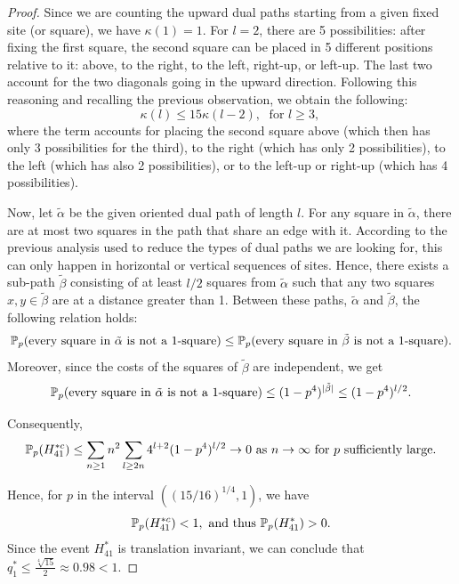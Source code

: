 \begin{proof}
            Since we are counting the upward dual paths starting from a given fixed site (or square), we have $\kappa(1) = 1$. For $l = 2$, there are 5 possibilities: after fixing the first square, the second square can be placed in 5 different positions relative to it: above, to the right, to the left, right-up, or left-up. The last two account for the two diagonals going in the upward direction. Following this reasoning and recalling the previous observation, we obtain the following:
            \[
                \kappa(l) \leq 15\kappa(l - 2),\; \text{  for $l \geq 3$, }
            \] 
            where the term accounts for placing the second square above (which then has only 3 possibilities for the third), to the right (which has only 2 possibilities), to the left (which has also 2 possibilities), or to the left-up or right-up (which has 4 possibilities).

            Now, let $\tilde{\alpha}$ be the given oriented dual path of length $l$. For any square in $\tilde{\alpha}$, there are at most two squares in the path that share an edge with it. According to the previous analysis used to reduce the types of dual paths we are looking for, this can only happen in horizontal or vertical sequences of sites. Hence, there exists a sub-path $\tilde{\beta}$ consisting of at least $l/2$ squares from $\tilde{\alpha}$ such that any two squares $x, y \in \tilde{\beta}$ are at a distance greater than 1. Between these paths, $\tilde{\alpha}$ and $\tilde{\beta}$, the following relation holds:
            $$
                \mathbb{P}_p(\text{every square in } \tilde{\alpha} \text{ is not a 1-square}) \leq \mathbb{P}_p(\text{every square in } \tilde{\beta} \text{ is not a 1-square}).
            $$ 
            Moreover, since the costs of the squares of $\tilde{\beta}$ are independent, we get
            \[
                \mathbb{P}_p(\text{every square in } \tilde{\alpha} \text{ is not a 1-square}) \leq (1 - p^4)^{|\tilde{\beta}|} \leq (1 - p^4)^{l/2}. 
            \]

            Consequently, 
            \[
                \mathbb{P}_p(H_{41}^{*c}) \leq \sum_{n \geq 1} n^2\sum_{l \geq 2n}  4^{l+2} (1 - p^4)^{l/2} \to 0 \text{ as } n \to \infty \text{ for } p \text{ sufficiently large}.
            \]

            Hence, for $p$ in the interval $((15/16)^{1/4}, 1)$, we have
            \[
                \mathbb{P}_p(H_{41}^{*c}) < 1, \text{ and thus } \mathbb{P}_p(H_{41}^*) > 0.
            \] 
            Since the event $H_{41}^*$ is translation invariant, we can conclude that $q _1^* \leq \frac{\sqrt[4]{15}}{2}\approx 0.98 < 1$.

        \end{proof}

